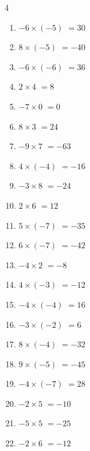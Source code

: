 \begin{multicols}{4}
\begin{enumerate}
  \item $-6\times (-5)$
        $=30$

  \item $8\times (-5)$
        $=-40$

  \item $-6\times (-6)$
        $=36$

  \item $2\times 4$
        $=8$

  \item $-7\times 0$
        $=0$

\columnbreak %

  \item $8\times 3$
        $=24$

  \item $-9\times 7$
        $=-63$

  \item $4\times (-4)$
        $=-16$

  \item $-3\times 8$
        $=-24$

  \item $2\times 6$
        $=12$

  \item $5\times (-7)$
        $=-35$

  \item $6\times (-7)$
        $=-42$

  \item $-4\times 2$
        $=-8$

  \item $4\times (-3)$
        $=-12$

  \item $-4\times (-4)$
        $=16$

  \item $-3\times (-2)$
        $=6$

  \item $8\times (-4)$
        $=-32$

  \item $9\times (-5)$
        $=-45$

  \item $-4\times (-7)$
        $=28$

  \item $-2\times 5$
        $=-10$

  \item $-5\times 5$
        $=-25$

  \item $-2\times 6$
        $=-12$


\end{enumerate}
\end{multicols}
